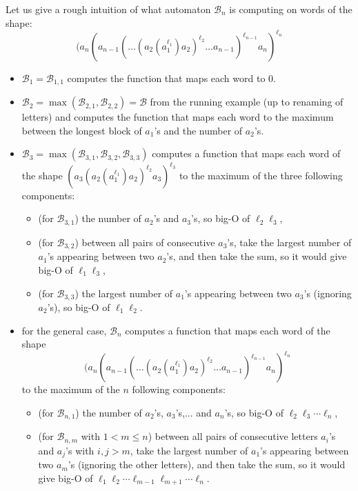 \documentclass[10pt,a4paper]{amsart}
\theoremstyle{definition}
\numberwithin{equation}{section}
\theoremstyle{remark}
\theoremstyle{remark}
\begin{document}
Let us give a rough intuition of what automaton $\mathcal{B}_n$ is computing on words of the shape: 
$$(a_n(a_{n-1}(\ldots (a_2(a_1^{\ell_1})a_2)^{\ell_2} \ldots a_{n-1})^{\ell_{n-1}}a_n)^{\ell_n}$$
\begin{itemize}
\item $\mathcal{B}_1 = \mathcal{B}_{1,1}$ computes the function that maps each word to $0$.
\item $\mathcal{B}_2 = \max(\mathcal{B}_{2,1}, \mathcal{B}_{2,2}) = \mathcal{B}$ from the running example (up to renaming of letters) and computes the function that maps each word to the maximum between the longest block of $a_1$'s and the number of $a_2$'s.
\item $\mathcal{B}_3 = \max(\mathcal{B}_{3,1}, \mathcal{B}_{3,2}, \mathcal{B}_{3,3})$ computes a function that maps each word of the shape $(a_3(a_2(a_1^{\ell_1})a_2)^{\ell_2}a_3)^{\ell_3}$ 
to the maximum of the three following components:
\begin{itemize}
    \item (for $\mathcal{B}_{3,1}$) the number of $a_2$'s and $a_3$'s, so big-O of $\ell_2\ell_3$,
    \item (for $\mathcal{B}_{3,2}$) between all pairs of consecutive $a_3$'s, take the largest number of $a_1$'s appearing between two $a_2$'s, and then take the sum, so it would give big-O of $\ell_1\ell_3$,
    \item (for $\mathcal{B}_{3,3}$) the largest number of $a_1$'s appearing between two $a_3$'s (ignoring $a_2$'s), so big-O of $\ell_1\ell_2$.
\end{itemize}
\item for the general case, $\mathcal{B}_n$ computes a function that maps each word of the shape 
$$(a_n(a_{n-1}(\ldots (a_2(a_1^{\ell_1})a_2)^{\ell_2} \ldots a_{n-1})^{\ell_{n-1}}a_n)^{\ell_n}$$ 
to the maximum of the $n$ following components:
\begin{itemize}
    \item (for $\mathcal{B}_{n,1}$) the number of $a_2$'s, $a_3$'s,... and $a_n$'s, so big-O of $\ell_2\ell_3 \dotsm \ell_n$,
    \item (for $\mathcal{B}_{n,m}$ with $1<m\leq n$) between all pairs of consecutive letters $a_i$'s and $a_j$'s with $i,j > m$, take the largest number of $a_1$'s appearing between two $a_m$'s (ignoring the other letters), and then take the sum, so it would give big-O of $\ell_1\ell_2 \dotsm \ell_{m-1}\ell_{m+1}\dotsm\ell_{n}$.
\end{itemize}
\end{itemize}
\end{document}

